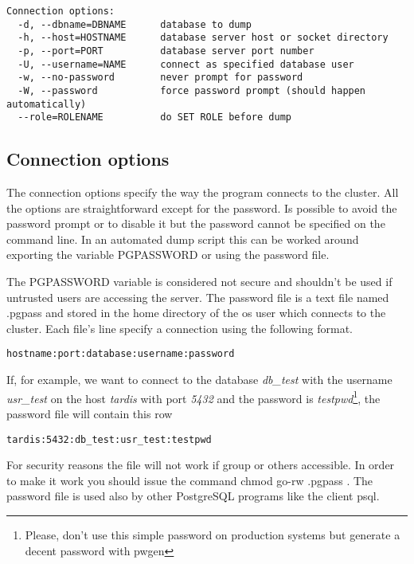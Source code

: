 \begin{verbatim}
Connection options:
  -d, --dbname=DBNAME      database to dump
  -h, --host=HOSTNAME      database server host or socket directory
  -p, --port=PORT          database server port number
  -U, --username=NAME      connect as specified database user
  -w, --no-password        never prompt for password
  -W, --password           force password prompt (should happen automatically)
  --role=ROLENAME          do SET ROLE before dump

\end{verbatim}

\subsection{Connection options}
The connection options specify the way the program connects to the cluster. All the options are 
straightforward except for the password. Is possible to avoid the password prompt or to disable it 
but the password cannot be specified on the command line. In an automated dump script this can be 
worked around exporting the variable PGPASSWORD or using the password 
file.\newline

The PGPASSWORD variable is considered not secure and shouldn't be used if untrusted users are 
accessing the server. The password file is a text file named .pgpass and stored in the home 
directory of the os user which connects to the cluster.\newline
Each file's line specify a connection using the following format.

\begin{verbatim}
hostname:port:database:username:password
\end{verbatim}

If, for example, we want to connect to the database \textit{db\_test} with the username 
\textit{usr\_test} on the host \textit{tardis} with port \textit{5432} and the password is 
\textit{testpwd}\footnote{Please, don't use this simple password on production systems but generate 
a decent password with pwgen}, the password file will contain this row

\begin{verbatim}
tardis:5432:db_test:usr_test:testpwd
\end{verbatim}

For security reasons the file will not work if group or others accessible. In order to make it work 
you should issue the command chmod go-rw .pgpass . The password file is used also by other
PostgreSQL programs like the client psql.\newline

